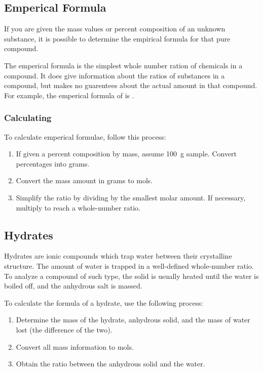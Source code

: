\subsection{Emperical Formula}
If you are given the mass values or percent composition of an unknown substance,
it is possible to determine the empirical formula for that pure compound.

The emperical formula is the simplest whole number ration of chemicals in a
compound. It does give information about the ratios of substances in a compound,
but makes no guarentees about the actual amount in that compound. For example,
the emperical formula of  is .

\subsubsection{Calculating}
To calculate emperical formulae, follow this process:
\begin{enumerate}
  \item If given a percent composition by mass, assume \SI{100}{\gram} sample.
    Convert percentages into grams.
  \item Convert the mass amount in grams to mols.
  \item Simplify the ratio by dividing by the smallest molar amount. If
    necessary, multiply to reach a whole-number ratio.
\end{enumerate}

\subsection{Hydrates}
Hydrates are ionic compounds which trap water between their crystalline
structure. The amount of water is trapped in a well-defined whole-number ratio.
To analyze a compound of such type, the solid is usually heated until the water
is boiled off, and the anhydrous salt is massed.

To calculate the formula of a hydrate, use the following process:
\begin{enumerate}
  \item Determine the mass of the hydrate, anhydrous solid, and the mass of
    water lost (the difference of the two).
  \item Convert all mass information to mols.
  \item Obtain the ratio between the anhydrous solid and the water.
\end{enumerate}

